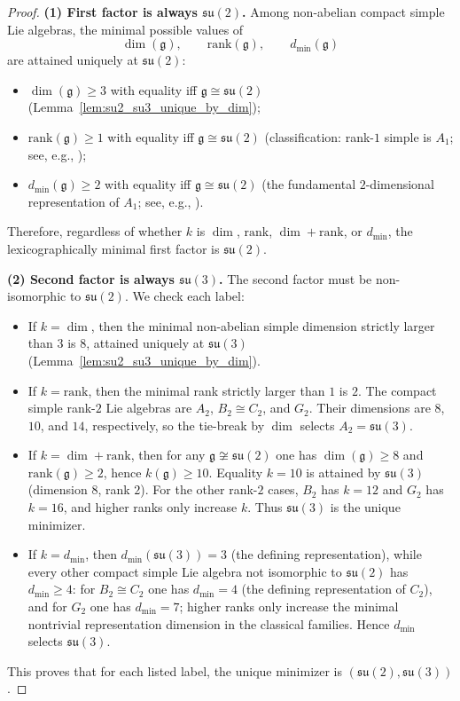 \begin{proof}
\textbf{(1) First factor is always $\mathfrak{su}(2)$.}
Among non-abelian compact simple Lie algebras, the minimal possible values of
\[
\dim(\mathfrak{g}),\qquad \mathrm{rank}(\mathfrak{g}),\qquad d_{\min}(\mathfrak{g})
\]
are attained uniquely at $\mathfrak{su}(2)$:
\begin{itemize}
  \item $\dim(\mathfrak{g})\ge 3$ with equality iff $\mathfrak{g}\cong\mathfrak{su}(2)$ (Lemma~\ref{lem:su2_su3_unique_by_dim});
  \item $\mathrm{rank}(\mathfrak{g})\ge 1$ with equality iff $\mathfrak{g}\cong\mathfrak{su}(2)$ (classification: rank-$1$ simple is $A_1$; see, e.g., \cite{HallLieGroups2015});
  \item $d_{\min}(\mathfrak{g})\ge 2$ with equality iff $\mathfrak{g}\cong\mathfrak{su}(2)$ (the fundamental $2$-dimensional representation of $A_1$; see, e.g., \cite{FultonHarris1991RepresentationTheory}).
\end{itemize}
Therefore, regardless of whether $k$ is $\dim$, $\mathrm{rank}$, $\dim{+}\mathrm{rank}$, or $d_{\min}$, the lexicographically minimal first factor is $\mathfrak{su}(2)$.

\medskip
\noindent\textbf{(2) Second factor is always $\mathfrak{su}(3)$.}
The second factor must be non-isomorphic to $\mathfrak{su}(2)$.
We check each label:
\begin{itemize}
  \item If $k=\dim$, then the minimal non-abelian simple dimension strictly larger than $3$ is $8$, attained uniquely at $\mathfrak{su}(3)$ (Lemma~\ref{lem:su2_su3_unique_by_dim}).
  \item If $k=\mathrm{rank}$, then the minimal rank strictly larger than $1$ is $2$.
  The compact simple rank-$2$ Lie algebras are $A_2$, $B_2\cong C_2$, and $G_2$.
  Their dimensions are $8$, $10$, and $14$, respectively, so the tie-break by $\dim$ selects $A_2=\mathfrak{su}(3)$.
  \item If $k=\dim+\mathrm{rank}$, then for any $\mathfrak{g}\not\cong\mathfrak{su}(2)$ one has $\dim(\mathfrak{g})\ge 8$ and $\mathrm{rank}(\mathfrak{g})\ge 2$, hence $k(\mathfrak{g})\ge 10$.
  Equality $k=10$ is attained by $\mathfrak{su}(3)$ (dimension $8$, rank $2$).
  For the other rank-$2$ cases, $B_2$ has $k=12$ and $G_2$ has $k=16$, and higher ranks only increase $k$.
  Thus $\mathfrak{su}(3)$ is the unique minimizer.
  \item If $k=d_{\min}$, then $d_{\min}(\mathfrak{su}(3))=3$ (the defining representation), while every other compact simple Lie algebra not isomorphic to $\mathfrak{su}(2)$ has $d_{\min}\ge 4$:
  for $B_2\cong C_2$ one has $d_{\min}=4$ (the defining representation of $C_2$), and for $G_2$ one has $d_{\min}=7$; higher ranks only increase the minimal nontrivial representation dimension in the classical families.
  Hence $d_{\min}$ selects $\mathfrak{su}(3)$.
\end{itemize}
This proves that for each listed label, the unique minimizer is $(\mathfrak{su}(2),\mathfrak{su}(3))$.
\end{proof}


